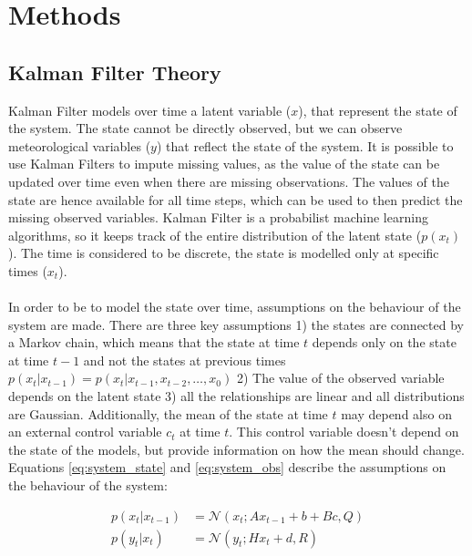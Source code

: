 \documentclass{article}
\newcommand{\norm}[3]{\mathcal{N}\left(#1; #2, #3\right)} %
\let\Oldsection\section
\renewcommand{\section}{\FloatBarrier\Oldsection}
\let\Oldsubsection\subsection
\renewcommand{\subsection}{\FloatBarrier\Oldsubsection}
\begin{document}
\section{Methods}

\subsection{Kalman Filter Theory}

Kalman Filter models over time a latent variable ($x$), that represent the state of the system. The state cannot be directly observed, but we can observe meteorological variables ($y$) that reflect the state of the system. It is possible to use Kalman Filters to impute missing values, as the value of the state can be updated over time even when there are missing observations. The values of the state are hence available for all time steps, which can be used to then predict the missing observed variables.
Kalman Filter is a probabilist machine learning algorithms, so it keeps track of the entire distribution of the latent state ($p(x_t)$). The time is considered to be discrete, the state is modelled only at specific times ($x_t$).  

\paragraph{} In order to be to model the state over time, assumptions on the behaviour of the system are made. There are three key assumptions 1) the states are connected by a Markov chain, which means that the state at time $t$ depends only on the state at time $t-1$ and not the states at previous times $p(x_t|x_{t-1}) = p(x_t|x_{t-1}, x_{t-2}, \hdots, x_0)$ 2) The value of the observed variable depends on the latent state 3) all the relationships are linear and all distributions are Gaussian. Additionally, the mean of the state at time $t$ may depend also on an external control variable $c_t$ at time $t$. This control variable doesn't depend on the state of the models, but provide information on how the mean should change.
Equations \ref{eq:system_state} and \ref{eq:system_obs} describe the assumptions on the behaviour of the system:

\begin{align}
p(x_t | x_{t-1}) &= \norm{x_t}{Ax_{t-1} + b + Bc}{Q} \label{eq:system_state}\\
p(y_t | x_t) &= \norm{y_t}{Hx_t + d}{R} \label{eq:system_obs}
\end{align}
\end{document}
